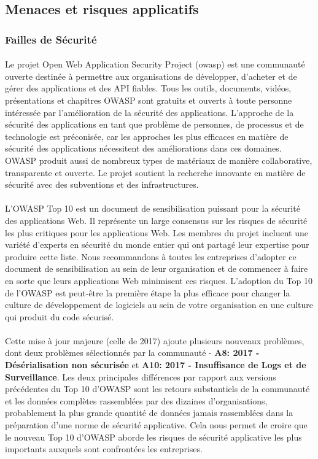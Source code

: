 	\subsection{Menaces et risques applicatifs}
	  \subsubsection{Failles de Sécurité}
	    \paragraph{}
	    Le projet Open Web Application Security Project (\gls{owasp}) est une communauté ouverte destinée à permettre aux organisations de développer, d'acheter et de gérer des applications et des API fiables. Tous les outils, documents, vidéos, présentations et chapitres OWASP sont gratuits et ouverts à toute personne intéressée par l'amélioration de la sécurité des applications. L'approche de la sécurité des applications en tant que problème de personnes, de processus et de technologie est  préconis\'ee, car les approches les plus efficaces en matière de sécurité des applications nécessitent des améliorations dans ces domaines. OWASP produit aussi de nombreux types de matériaux de manière collaborative, transparente et ouverte. Le projet soutient la recherche innovante en matière de sécurité avec des subventions et des infrastructures.
	    
	    \paragraph{}
	    L'OWASP Top 10 est un document de sensibilisation puissant pour la sécurité des applications Web. Il représente un large consensus sur les risques de sécurité les plus critiques pour les applications Web. Les membres du projet incluent une variété d'experts en sécurité du monde entier qui ont partagé leur expertise pour produire cette liste.
	    Nous recommandons \`a toutes les entreprises d'adopter ce document de sensibilisation au sein de leur organisation et de commencer à faire en sorte que leurs applications Web minimisent ces risques. L'adoption du Top 10 de l'OWASP est peut-être la première étape la plus efficace pour changer la culture de développement de logiciels au sein de votre organisation en une culture qui produit du code sécurisé.
	    \paragraph{}
	    Cette mise à jour majeure (celle de 2017) ajoute plusieurs nouveaux problèmes, dont deux problèmes sélectionnés par la communauté - \textbf{A8: 2017 - Dés\'erialisation non sécurisée} et \textbf{A10: 2017 - Insuffisance de Logs et de Surveillance}. Les deux principales différences par rapport aux versions précédentes du Top 10 d'OWASP sont les retours substantiels de la communauté et les données complètes rassemblées par des dizaines d'organisations, probablement la plus grande quantité de données jamais rassemblées dans la préparation d'une norme de sécurité applicative. Cela nous permet de croire que le nouveau Top 10 d'OWASP aborde les risques de sécurité applicative les plus importants auxquels sont confrontées les entreprises.
